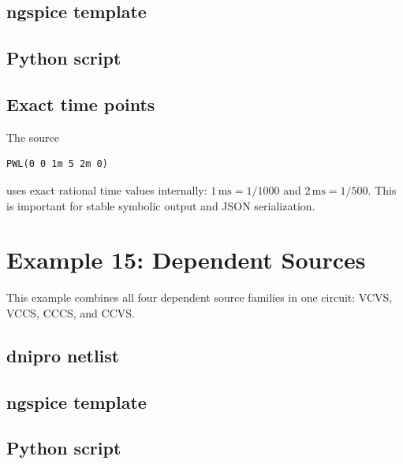 \documentclass[11pt,a4paper]{article}
\begin{document}
\subsection{ngspice template}



\subsection{Python script}



\subsection{Exact time points}

The source

\begin{lstlisting}[style=spice]
PWL(0 0 1m 5 2m 0)
\end{lstlisting}

uses exact rational time values internally: \(1\,\mathrm{ms}=1/1000\) and
\(2\,\mathrm{ms}=1/500\). This is important for stable symbolic output and JSON
serialization.

\section{Example 15: Dependent Sources}
\label{sec:ex-dependent-sources}

This example combines all four dependent source families in one circuit:
VCVS, VCCS, CCCS, and CCVS.

\subsection{dnipro netlist}



\subsection{ngspice template}



\subsection{Python script}
\end{document}
